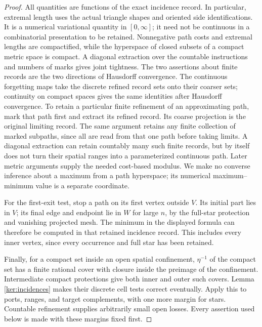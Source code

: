 \documentclass[11pt]{article}
\numberwithin{equation}{section}
\theoremstyle{definition}
\theoremstyle{remark}
\newcommand{\1}{\mathbf 1}
\begin{document}
\begin{proof}
All quantities are functions of the exact incidence record.  In
particular, extremal length uses the actual triangle shapes and
oriented side identifications.  It is a numerical variational
quantity in \([0,\infty]\); it need not be continuous in a combinatorial
presentation to be retained.  Nonnegative path costs and extremal
lengths are compactified, while the hyperspace of closed subsets of
a compact metric space is compact.  A diagonal extraction over the
countable instructions and numbers of marks gives joint tightness.
The two assertions about finite records are the two directions of
Hausdorff convergence.  The continuous forgetting maps take the
discrete refined record sets onto their coarser sets; continuity on
compact spaces gives the same identities after Hausdorff convergence.
To retain a particular finite refinement of an approximating path,
mark that path first and extract its refined record.  Its coarse
projection is the original limiting record.  The same argument
retains any finite collection of marked subpaths, since all are
read from that one path before taking limits.  A diagonal extraction
can retain countably many such finite records, but by itself does
not turn their spatial ranges into a parameterized continuous path.
Later metric arguments supply the needed cost-based modulus.
We make no converse inference about a maximum from a path hyperspace;
its numerical maximum--minimum value is a separate coordinate.

For the first-exit test, stop a path on its first vertex outside
\(V\).  Its initial part lies in \(V\); its final edge and endpoint
lie in \(W\) for large \(n\), by the full-star protection and vanishing
projected mesh.  The minimum in the displayed formula can therefore
be computed in that retained incidence record.  This includes every
inner vertex, since every occurrence and full star has been retained.

Finally, for a compact set inside an open spatial confinement,
\(\eta^{-1}\) of the compact set has a finite rational cover with
closure inside the preimage of the confinement.  Intermediate compact
protections give both inner and outer such covers.  Lemma
\ref{ker:incidences} makes their discrete cell tests correct eventually.
Apply this to ports, ranges, and target complements, with one more
margin for stars.  Countable refinement supplies arbitrarily small
open losses.  Every assertion used below is made with these margins
fixed first.
\end{proof}
\end{document}
